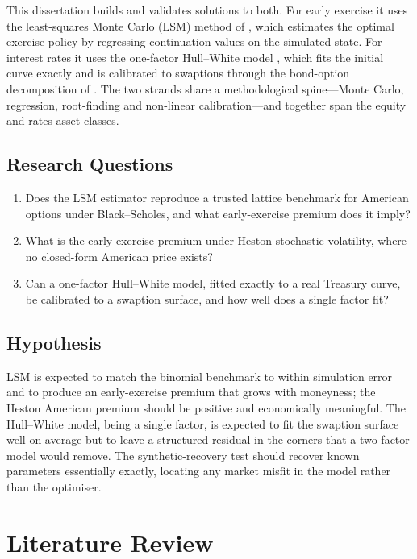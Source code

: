 \documentclass[11pt,a4paper]{report}
\begin{document}
This dissertation builds and validates solutions to both. For early exercise it uses
the least-squares Monte Carlo (LSM) method of \citet{longstaff2001}, which estimates
the optimal exercise policy by regressing continuation values on the simulated
state. For interest rates it uses the one-factor Hull--White model
\citep{hullwhite1990}, which fits the initial curve exactly and is calibrated to
swaptions through the bond-option decomposition of \citet{jamshidian1989}. The two
strands share a methodological spine---Monte Carlo, regression, root-finding and
non-linear calibration---and together span the equity and rates asset classes.

\section{Research Questions}
\begin{enumerate}
\item Does the LSM estimator reproduce a trusted lattice benchmark for American
options under Black--Scholes, and what early-exercise premium does it imply?
\item What is the early-exercise premium under Heston stochastic volatility, where
no closed-form American price exists?
\item Can a one-factor Hull--White model, fitted exactly to a real Treasury curve,
be calibrated to a swaption surface, and how well does a single factor fit?
\end{enumerate}

\section{Hypothesis}
LSM is expected to match the binomial benchmark to within simulation error and to
produce an early-exercise premium that grows with moneyness; the Heston American
premium should be positive and economically meaningful. The Hull--White model,
being a single factor, is expected to fit the swaption surface well on average but
to leave a structured residual in the corners that a two-factor model would remove.
The synthetic-recovery test should recover known parameters essentially exactly,
locating any market misfit in the model rather than the optimiser.

\chapter{Literature Review}
\end{document}
